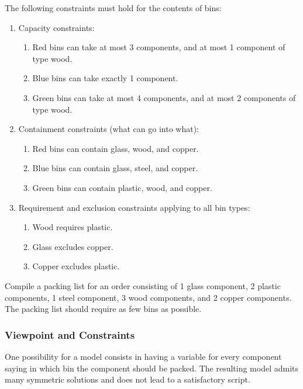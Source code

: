 \documentclass[a4paper,halfparskip]{scrartcl}
\begin{document}
The following constraints must hold for the contents of bins:
\begin{enumerate}
\item
Capacity constraints:
\begin{enumerate}       
\item
Red bins can take at most 3 components, and at most 1 component of type wood.
\item
Blue bins can take exactly 1 component.
\item
Green bins can take at most 4 components, and at most 2 components of type wood.
\end{enumerate}
\item
Containment constraints (what can go into what):
\begin{enumerate}       
\item    
Red bins can contain glass, wood, and copper.
\item        
Blue bins can contain glass, steel, and copper.
\item        
Green bins can contain plastic, wood, and copper.
\end{enumerate}
\item
Requirement and exclusion constraints applying to all bin types:
\begin{enumerate}    
\item         
Wood requires plastic.
\item       
Glass excludes copper.
\item          
Copper excludes plastic.
\end{enumerate}
\end{enumerate}
Compile a packing list for an order consisting of 1 glass component, 
2 plastic components, 1 steel component, 3 wood components, and 2 
copper components. The packing list should require as few bins as possible.

\subsubsection{Viewpoint and Constraints}
One possibility for a model consists in having a variable for every 
component saying in which bin the component should be packed. The 
resulting model admits many symmetric solutions and does not lead 
to a satisfactory script.
\end{document}
